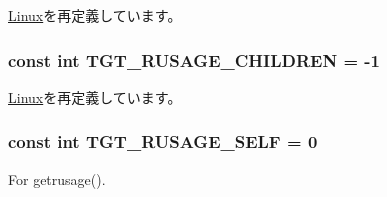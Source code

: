 \hyperlink{classLinux_af555fb2e49227259e6f6a78e2f6996e4}{Linux}を再定義しています。\hypertarget{classArmLinux64_a9a340e7463be441b8aeb8ea0a109e1bc}{
\subsubsection[{TGT\_\-RUSAGE\_\-CHILDREN}]{\setlength{\rightskip}{0pt plus 5cm}const int {\bf TGT\_\-RUSAGE\_\-CHILDREN} = -\/1}}
\label{classArmLinux64_a9a340e7463be441b8aeb8ea0a109e1bc}


\hyperlink{classLinux_a9a340e7463be441b8aeb8ea0a109e1bc}{Linux}を再定義しています。\hypertarget{classArmLinux64_a9e303b6c52672934210e6db497f0da88}{
\subsubsection[{TGT\_\-RUSAGE\_\-SELF}]{\setlength{\rightskip}{0pt plus 5cm}const int {\bf TGT\_\-RUSAGE\_\-SELF} = 0}}
\label{classArmLinux64_a9e303b6c52672934210e6db497f0da88}


For getrusage(). 

